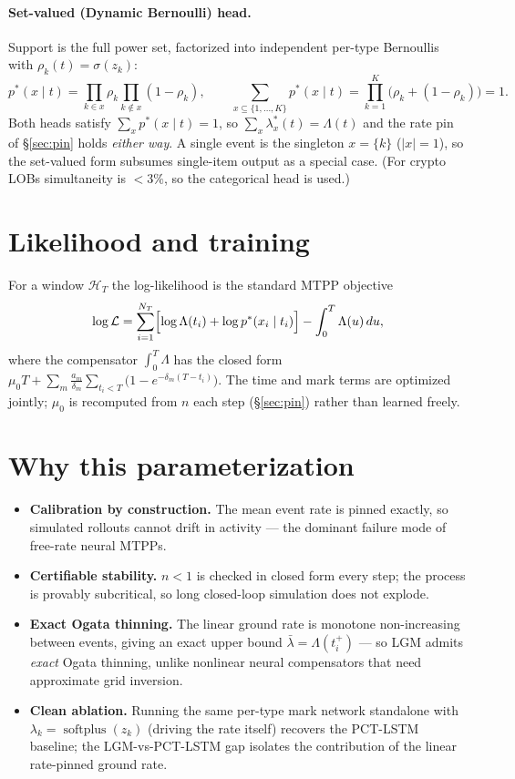 \documentclass[11pt]{article}
\newcommand{\Lam}{\Lambda}
\newcommand{\Hist}{\mathcal{H}}
\newcommand{\softplus}{\operatorname{softplus}}
\begin{document}
\paragraph{Set-valued (Dynamic Bernoulli) head.} Support is the full power set, factorized into
independent per-type Bernoullis with $\rho_k(t)=\sigma(z_k)$:
\[
p^*(x\mid t)=\prod_{k\in x}\rho_k\prod_{k\notin x}(1-\rho_k),\qquad
\sum_{x\subseteq\{1,\dots,K\}}p^*(x\mid t)=\prod_{k=1}^{K}\bigl(\rho_k+(1-\rho_k)\bigr)=1.
\]
Both heads satisfy $\sum_x p^*(x\mid t)=1$, so $\sum_x\lambda_x^*(t)=\Lam(t)$ and the rate pin of
\S\ref{sec:pin} holds \emph{either way}. A single event is the singleton $x=\{k\}$ ($|x|=1$), so the
set-valued form subsumes single-item output as a special case. (For crypto LOBs simultaneity is
$<3\%$, so the categorical head is used.)

\section{Likelihood and training}
For a window $\Hist_T$ the log-likelihood is the standard MTPP objective
\[
\log\mathcal{L}=\sum_{i=1}^{N_T}\Bigl[\log\Lam(t_i)+\log p^*(x_i\mid t_i)\Bigr]-\int_0^T\Lam(u)\,du,
\]
where the compensator $\int_0^T\Lam$ has the closed form
$\mu_0 T+\sum_m \tfrac{a_m}{\delta_m}\sum_{t_i<T}\bigl(1-e^{-\delta_m(T-t_i)}\bigr)$.
The time and mark terms are optimized jointly; $\mu_0$ is recomputed from $n$ each step
(\S\ref{sec:pin}) rather than learned freely.

\section{Why this parameterization}
\begin{itemize}[leftmargin=1.4em,itemsep=2pt]
  \item \textbf{Calibration by construction.} The mean event rate is pinned exactly, so simulated
  rollouts cannot drift in activity --- the dominant failure mode of free-rate neural MTPPs.
  \item \textbf{Certifiable stability.} $n<1$ is checked in closed form every step; the process is
  provably subcritical, so long closed-loop simulation does not explode.
  \item \textbf{Exact Ogata thinning.} The linear ground rate is monotone non-increasing between
  events, giving an exact upper bound $\bar\lambda=\Lam(t_i^+)$ --- so LGM admits \emph{exact}
  Ogata thinning, unlike nonlinear neural compensators that need approximate grid inversion.
  \item \textbf{Clean ablation.} Running the same per-type mark network standalone with
  $\lambda_k=\softplus(z_k)$ (driving the rate itself) recovers the PCT-LSTM baseline; the
  LGM-vs-PCT-LSTM gap isolates the contribution of the linear rate-pinned ground rate.
\end{itemize}
\end{document}
